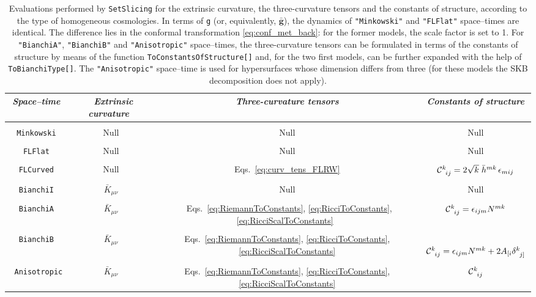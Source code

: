 \documentclass[notitlepage,onecolumn,floatfix,preprintnumbers,aps,prd,showpacs,nofootinbib,amsmath,amssymb,amsfonts]{revtex4-1}
\newcommand{\<}{\langle}
\renewcommand{\>}{\rangle}
\begin{document}
\vspace{2mm}
\begin{table}[htb]
	\begin{tabular}{c|c|c|c}
		\textit{Space--time} & \, \textit{Extrinsic curvature} \, & \textit{Three-curvature tensors} & \textit{Constants of structure} \\[3pt]
		\hline
		&&&\\[-7pt]
		{\tt Minkowski} & Null & Null & Null \\
		&&&\\
		{\tt FLFlat} & Null & Null & Null \\
		&&&\\
		{\tt FLCurved} & Null & Eqs.~\eqref{eq:curv_tens_FLRW} & ${\cal C}^k_{\phantom{k} i j} = 2 \sqrt{k} \; \bar h^{mk} \, \epsilon_{m i j} $ \\ 
		&&&\\
		{\tt BianchiI} & $\bar K_{\mu \nu}$ & Null & Null\\
		&&&\\
		{\tt BianchiA} & $\bar K_{\mu \nu}$ & \, Eqs.~\eqref{eq:RiemannToConstants}, \eqref{eq:RicciToConstants}, \eqref{eq:RicciScalToConstants} \, 
			& ${\cal C}^k_{\phantom{k} i j} = \epsilon_{i j m} N^{m k}$\\ 
		&&&\\
		{\tt BianchiB} & $\bar K_{\mu \nu}$ & Eqs.~\eqref{eq:RiemannToConstants}, \eqref{eq:RicciToConstants}, \eqref{eq:RicciScalToConstants} 
			& \, ${\cal C}^k_{\phantom{k} i j} = \epsilon_{i j m} N^{m k} + 2 A_{[i} \delta^k_{\phantom{k} j]}$\\
		&&&\\
		\, {\tt Anisotropic} \, & $\bar K_{\mu \nu}$ & Eqs.~\eqref{eq:RiemannToConstants}, \eqref{eq:RicciToConstants}, \eqref{eq:RicciScalToConstants} 
			& ${\cal C}^k_{\phantom{k} i j}$\\[3pt]
	\end{tabular}
	\vspace{1mm}
	\caption{Evaluations performed by {\tt SetSlicing} for the extrinsic curvature, the three-curvature tensors and the constants of structure, 
		according to the type of homogeneous cosmologies. In terms of {\tt g} (or, equivalently, $\bm{\bar g}$), the dynamics of 
		{\tt "Minkowski"} and {\tt "FLFlat"} space--times are identical. The difference lies in the conformal transformation \eqref{eq:conf_met_back}: 
		for the former models, the scale factor is set to 1. For {\tt "BianchiA"}, {\tt "BianchiB"} and {\tt "Anisotropic"} space--times, 
		the three-curvature tensors can be formulated in terms of the constants of structure by means of the function {\tt ToConstantsOfStructure[]} 
		and, for the two first models, can be further expanded with the help of {\tt ToBianchiType[]}. The {\tt "Anisotropic"} space--time is used for hypersurfaces 
		whose dimension differs from three (for these models the SKB decomposition does not apply).} 
	\label{tab:eval_curv}
\end{table}
\end{document}
